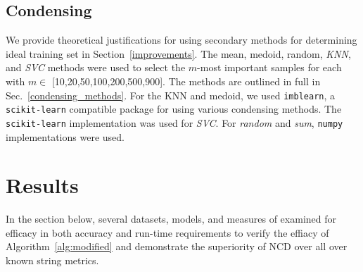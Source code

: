 \documentclass[conference]{IEEEtran}
\begin{document}
\subsection{Condensing}
\label{condensing}
We provide theoretical justifications for using secondary methods for determining ideal training set in Section~\ref{improvements}. The mean, medoid, random, \textit{KNN}, and \textit{SVC} methods were used to select the $m$-most important samples for each with $m \in$ [10,20,50,100,200,500,900]. The methods are outlined in full in Sec.~\ref{condensing_methods}. For the KNN and medoid, we used \texttt{imblearn}, a \texttt{scikit-learn} compatible package for using various condensing methods. The \texttt{scikit-learn} implementation was used for \textit{SVC}. For \textit{random} and \textit{sum}, \texttt{numpy} implementations were used.


\section{Results}
\label{results}
In the section below, several datasets, models, and measures of examined for efficacy in both accuracy and run-time requirements to verify the effiacy of Algorithm~\ref{alg:modified} and demonstrate the superiority of NCD over all over known string metrics.
\end{document}
